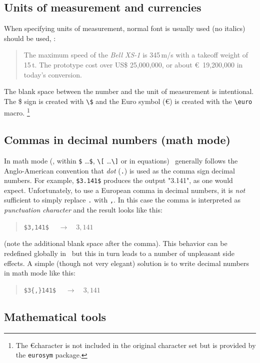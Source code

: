 \subsection{Units of measurement and currencies}

When specifying units of measurement, normal font is usually used (no italics) 
should be used, \eg:
%
\begin{quote}
	The maximum speed of the \textit{Bell XS-1} is 345\,m/s with a takeoff weight 
	of 15\,t. The prototype cost over US\$ 25,000,000, or about \euro\ 19,200,000 
	in today's conversion.
\end{quote}
%
The blank space between the number and the unit of measurement is intentional.
The \$ sign is created with \verb!\$! and the Euro symbol (\euro) is created
with the \verb!\euro! macro.%
\footnote{The \euro character is not included in the original \latex character
set but is provided by the \texttt{eurosym} package.}


\subsection{Commas in decimal numbers (math mode)}


In math mode (\ie, within \verb!$! \ldots \verb!$!, \verb!\[! \ldots \verb!\]! or 
in equations) \latex\ generally follows the Anglo-American convention that 
\emph{dot} (\verb!.!) is used as the comma sign decimal numbers.
For example, \verb!$3.141$! produces the output "3.141", as one would expect.
Unfortunately, to use a European comma in decimal numbers, it is \emph{not}
sufficient to simply replace \verb!.! with \verb!,!.
In this case the comma is interpreted as \emph{punctuation character} and 
the result looks like this:
%
\begin{quote}
	\verb!$3,141$! $\quad \rightarrow \quad 3,141$
\end{quote}
%
(note the additional blank space after the comma). This behavior can be
redefined globally in \latex\, but this in turn leads to a number of unpleasant
side effects. A simple (though not very elegant) solution is to write decimal
numbers in math mode like this:
%
\begin{quote}
	\verb!$3{,}141$! $\quad \rightarrow \quad 3{,}141$
\end{quote}


\subsection{Mathematical tools}

